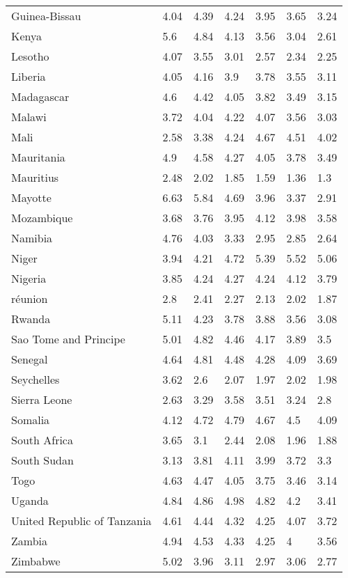 \begin{longtable}[t]{lllllll}
Guinea-Bissau & 4.04 & 4.39 & 4.24 & 3.95 & 3.65 & 3.24\\
Kenya & 5.6 & 4.84 & 4.13 & 3.56 & 3.04 & 2.61\\
Lesotho & 4.07 & 3.55 & 3.01 & 2.57 & 2.34 & 2.25\\
Liberia & 4.05 & 4.16 & 3.9 & 3.78 & 3.55 & 3.11\\
Madagascar & 4.6 & 4.42 & 4.05 & 3.82 & 3.49 & 3.15\\
Malawi & 3.72 & 4.04 & 4.22 & 4.07 & 3.56 & 3.03\\
Mali & 2.58 & 3.38 & 4.24 & 4.67 & 4.51 & 4.02\\
Mauritania & 4.9 & 4.58 & 4.27 & 4.05 & 3.78 & 3.49\\
Mauritius & 2.48 & 2.02 & 1.85 & 1.59 & 1.36 & 1.3\\
Mayotte & 6.63 & 5.84 & 4.69 & 3.96 & 3.37 & 2.91\\
Mozambique & 3.68 & 3.76 & 3.95 & 4.12 & 3.98 & 3.58\\
Namibia & 4.76 & 4.03 & 3.33 & 2.95 & 2.85 & 2.64\\
Niger & 3.94 & 4.21 & 4.72 & 5.39 & 5.52 & 5.06\\
Nigeria & 3.85 & 4.24 & 4.27 & 4.24 & 4.12 & 3.79\\
réunion & 2.8 & 2.41 & 2.27 & 2.13 & 2.02 & 1.87\\
Rwanda & 5.11 & 4.23 & 3.78 & 3.88 & 3.56 & 3.08\\
Sao Tome and Principe & 5.01 & 4.82 & 4.46 & 4.17 & 3.89 & 3.5\\
Senegal & 4.64 & 4.81 & 4.48 & 4.28 & 4.09 & 3.69\\
Seychelles & 3.62 & 2.6 & 2.07 & 1.97 & 2.02 & 1.98\\
Sierra Leone & 2.63 & 3.29 & 3.58 & 3.51 & 3.24 & 2.8\\
Somalia & 4.12 & 4.72 & 4.79 & 4.67 & 4.5 & 4.09\\
South Africa & 3.65 & 3.1 & 2.44 & 2.08 & 1.96 & 1.88\\
South Sudan & 3.13 & 3.81 & 4.11 & 3.99 & 3.72 & 3.3\\
Togo & 4.63 & 4.47 & 4.05 & 3.75 & 3.46 & 3.14\\
Uganda & 4.84 & 4.86 & 4.98 & 4.82 & 4.2 & 3.41\\
United Republic of Tanzania & 4.61 & 4.44 & 4.32 & 4.25 & 4.07 & 3.72\\
Zambia & 4.94 & 4.53 & 4.33 & 4.25 & 4 & 3.56\\
Zimbabwe & 5.02 & 3.96 & 3.11 & 2.97 & 3.06 & 2.77\\*
\end{longtable}
\endgroup{}
